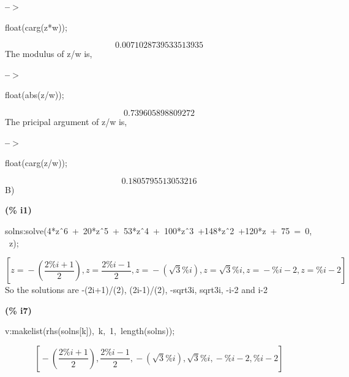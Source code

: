 \documentclass[fleqn]{article}
\begin{document}
\noindent
\begin{minipage}[t]{4.000000em}\color{red}\bfseries
 --\ensuremath{\ensuremath{>}}	
\end{minipage}
\begin{minipage}[t]{\textwidth}\color{blue}
float(carg(z*w));
\end{minipage}
\[\displaystyle \tag{\% o12} 
0.0071028739533513935\mbox{}
\]
The modulus of z/w is,


\noindent
\begin{minipage}[t]{4.000000em}\color{red}\bfseries
 --\ensuremath{\ensuremath{>}}	
\end{minipage}
\begin{minipage}[t]{\textwidth}\color{blue}
float(abs(z/w));
\end{minipage}
\[\displaystyle \tag{\% o10} 
0.739605898809272\mbox{}
\]
The pricipal argument of z/w is,


\noindent
\begin{minipage}[t]{4.000000em}\color{red}\bfseries
 --\ensuremath{\ensuremath{>}}	
\end{minipage}
\begin{minipage}[t]{\textwidth}\color{blue}
float(carg(z/w));
\end{minipage}
\[\displaystyle \tag{\% o11} 
0.1805795513053216\mbox{}
\]
B)


\noindent
\begin{minipage}[t]{4.000000em}\color{red}\bfseries
(\% i1)	
\end{minipage}
\begin{minipage}[t]{\textwidth}\color{blue}
solns:solve(4*z\^\ 6\ +\ 20*z\^\ 5\ +\ 53*z\^\ 4\ +\ 100*z\^\ 3\ +148*z\^\ 2\ +120*z\ +\ 75\ =\ 0,\ z);
\end{minipage}
\[\displaystyle \tag{solns} 
\left[ z\mathop{=}\mathop{-}\left( \frac{2 \% i\mathop{+}1}{2}\right) \mathop{,}z\mathop{=}\frac{2 \% i\mathop{-}1}{2}\mathop{,}z\mathop{=}\mathop{-}\left( \sqrt{3} \% i\right) \mathop{,}z\mathop{=}\sqrt{3} \% i\mathop{,}z\mathop{=}\mathop{-}\% i\mathop{-}2\mathop{,}z\mathop{=}\% i\mathop{-}2\right] \mbox{}
\]
So the solutions are -(2i+1)/(2), (2i-1)/(2), -sqrt{3}i, sqrt{3}i, -i-2 and i-2


\noindent
\begin{minipage}[t]{4.000000em}\color{red}\bfseries
(\% i7)	
\end{minipage}
\begin{minipage}[t]{\textwidth}\color{blue}
v:makelist(rhs(solns[k]),\ k,\ 1,\ length(solns));
\end{minipage}
\[\displaystyle \tag{v} 
\left[ \mathop{-}\left( \frac{2 \% i\mathop{+}1}{2}\right) \mathop{,}\frac{2 \% i\mathop{-}1}{2}\mathop{,}\mathop{-}\left( \sqrt{3} \% i\right) \mathop{,}\sqrt{3} \% i\mathop{,}\mathop{-}\% i\mathop{-}2\mathop{,}\% i\mathop{-}2\right] \mbox{}
\]
\end{document}
